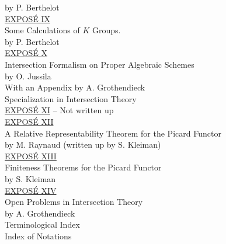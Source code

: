 by P. Berthelot \\[8pt]
\underline{EXPOSÉ IX}\\
Some Calculations of $K$ Groups.\\
by P. Berthelot \\[8pt]
\underline{EXPOSÉ X}\\
Intersection Formalism on Proper Algebraic Schemes\\
by O. Jussila\\
With an Appendix by A. Grothendieck\\
Specialization in Intersection Theory \\[8pt]
\underline{EXPOSÉ XI} -- Not written up\\[8pt]
\underline{EXPOSÉ XII}\\
A Relative Representability Theorem for the Picard Functor\\
by M. Raynaud (written up by S. Kleiman) \\[8pt]
\underline{EXPOSÉ XIII}\\
Finiteness Theorems for the Picard Functor\\
by S. Kleiman \\[8pt]
\underline{EXPOSÉ XIV}\\
Open Problems in Intersection Theory\\
by A. Grothendieck \\[8pt]
Terminological Index \\[4pt]
Index of Notations \par

